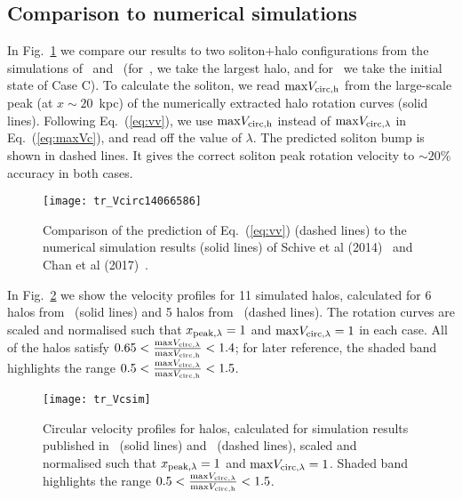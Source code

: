 \documentclass[aps,prd,floats,superscriptaddress,showpacs,nofootinbib,twocolumn,preprintnumbers]{revtex4-1}%
\begin{document}
\subsection{Comparison to numerical simulations}\label{ss:compsim}
%
In Fig.~\ref{fig:Vcirc1406.6586} we compare our results to two soliton+halo configurations from the simulations of~\cite{Schive:2014dra} and~\cite{2017arXiv171201947C} (for~\cite{Schive:2014dra}, we take the largest halo, and for~\cite{2017arXiv171201947C} we take the initial state of Case C). To calculate the soliton, we read ${\max}V_{\rm circ,h}$ from the large-scale peak (at $x\sim20$~kpc) of the numerically extracted halo rotation curves (solid lines). Following Eq.~(\ref{eq:vv}), we use ${\max}V_{\rm circ,h}$ instead of ${\max}V_{\rm circ,\lambda}$ in Eq.~(\ref{eq:maxVc}), and read off the value of $\lambda$. %
%
The predicted soliton bump is shown in dashed lines. It gives the correct soliton peak rotation velocity to $\sim20$\% accuracy in both cases. 
%
\begin{figure}[hbp!]
\centering
\texttt{[image: tr\_Vcirc14066586]}
\caption{Comparison of the prediction of Eq.~(\ref{eq:vv}) (dashed
  lines) to the numerical simulation results (solid lines) of
  Schive et al (2014)~\cite{Schive:2014dra} and
Chan et al (2017)~\cite{2017arXiv171201947C}. 
}\label{fig:Vcirc1406.6586}
\end{figure}
%

In Fig.~\ref{fig:Vcsim} we show the velocity profiles for 11 simulated
halos, calculated for 6 halos from~\cite{Schive:2014hza} (solid lines)
and 5 halos from~\cite{Schive:2014dra} (dashed lines). The rotation
curves are scaled and normalised such that $x_{\rm peak,\lambda}=1$
and ${\max}V_{\rm circ,\lambda}=1$ in each case. All of the halos
satisfy $0.65<\frac{{\max}V_{\rm circ,\lambda}}{{\max}V_{\rm
    circ,h}}<1.4$;  
for later reference, the shaded band highlights the range
$0.5<\frac{{\max}V_{\rm circ,\lambda}}{{\max}V_{\rm circ,h}}<1.5$. 
%
\begin{figure}[hbp!]
\centering
\texttt{[image: tr\_Vcsim]}
\caption{Circular velocity profiles for halos, calculated for simulation results published in~\cite{Schive:2014hza} (solid lines) and~\cite{Schive:2014dra} (dashed lines), scaled and normalised such that $x_{\rm peak,\lambda}=1$ and ${\max}V_{\rm circ,\lambda}=1$. Shaded band highlights the range $0.5<\frac{{\max}V_{\rm circ,\lambda}}{{\max}V_{\rm circ,h}}<1.5$.
}\label{fig:Vcsim}
\end{figure}
%
\end{document}
